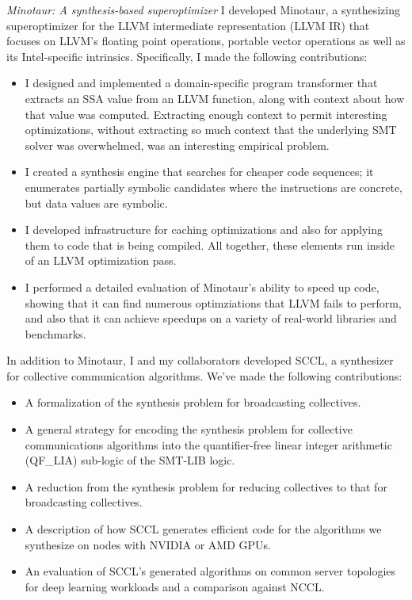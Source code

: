 \emph{Minotaur: A synthesis-based superoptimizer} I developed
Minotaur, a synthesizing superoptimizer for the LLVM intermediate
representation (LLVM IR) that focuses on LLVM's floating point
operations, portable vector operations as well as its Intel-specific
intrinsics. Specifically, I made the following contributions:

\begin{itemize}
    \item I designed and implemented a domain-specific program
    transformer that extracts an SSA value from an LLVM function,
    along with context about how that value was computed.
    Extracting enough context to permit interesting optimizations,
    without extracting so much context that the underlying SMT
    solver was overwhelmed, was an interesting empirical problem.

    \item I created a synthesis engine that searches for cheaper code
    sequences; it enumerates partially symbolic candidates where the
    instructions are concrete, but data values are symbolic.
    \item I developed infrastructure for caching optimizations and also
    for applying them to code that is being compiled.
    All together, these elements run inside of an LLVM optimization pass.
    \item I performed a detailed evaluation of Minotaur's ability to
    speed up code, showing that it can find numerous optimziations that
    LLVM fails to perform, and also that it can achieve speedups on a
    variety of real-world libraries and benchmarks.
\end{itemize}

In addition to Minotaur, I and my collaborators developed SCCL, a
synthesizer for collective communication algorithms. We've made the
following contributions:

\begin{itemize}
\item A formalization of the synthesis problem for broadcasting
collectives.

\item A general strategy for encoding the synthesis problem for
collective communications algorithms into the quantifier-free linear
integer arithmetic (QF\_LIA) sub-logic of the SMT-LIB logic.

\item A reduction from the synthesis problem for reducing collectives
to that for broadcasting collectives.

\item A description of how SCCL generates efficient code for the
algorithms we synthesize on nodes with NVIDIA or AMD GPUs.

\item An evaluation of SCCL's generated algorithms on common server
topologies for deep learning workloads and a comparison against NCCL.

\end{itemize}

